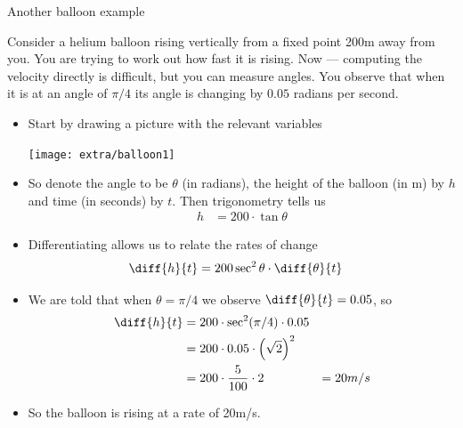 Another balloon example
\begin{eg}\label{eg_3_2_1}
Consider a helium balloon rising vertically from a fixed point 200m away from
you. You are trying to work out how fast it is rising. Now --- computing the
velocity directly is difficult, but you can measure angles. You observe that
when it is at an angle of $\pi/4$ its angle is changing by $0.05$ radians per
second.

\begin{itemize}
 \item Start by drawing a picture with the relevant variables
\begin{efig}
\begin{center}
 \texttt{[image: extra/balloon1]}
\end{center}
\end{efig}
\item So denote the angle to be $\theta$ (in radians), the height of the balloon (in m)
by $h$ and time (in seconds) by $t$. Then trigonometry tells us
\begin{align*}
  h &= 200 \cdot \tan \theta
\end{align*}
\item Differentiating allows us to relate the rates of change
\begin{align*}
  \diff{h}{t} &= 200 \sec^2 \theta \cdot \diff{\theta}{t}
\end{align*}
\item We are told that when $\theta =\pi/4$ we observe $\diff{\theta}{t} =
0.05$, so
\begin{align*}
  \diff{h}{t} &= 200 \cdot \sec^2(\pi/4) \cdot 0.05 \\
  &= 200 \cdot 0.05 \cdot \left( \sqrt{2} \right)^2 \\
  &= 200 \cdot \frac{5}{100} \cdot 2
  &= 20 m/s
\end{align*}
\item So the balloon is rising at a rate of 20m/s.
\end{itemize}

\end{eg}



